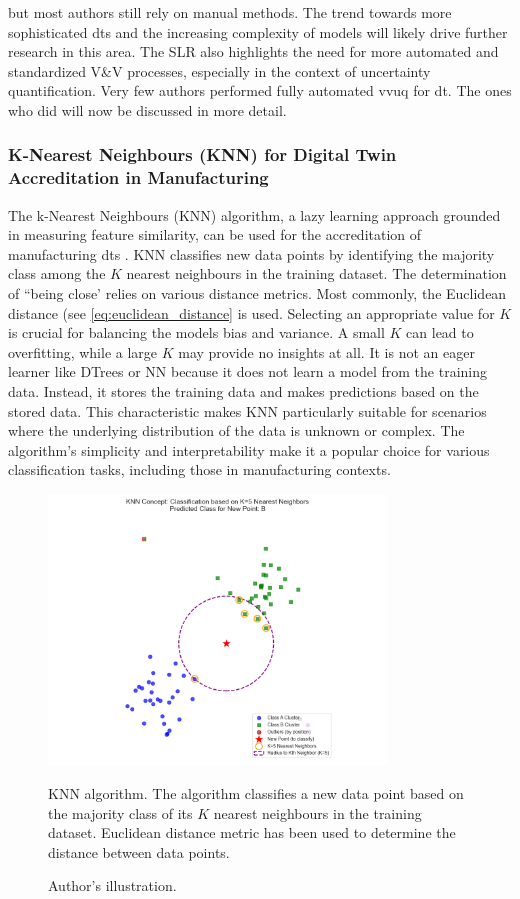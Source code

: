 but most authors still rely on manual methods. The trend towards more sophisticated \gls{dt}s and the increasing complexity of models will likely drive further research in this area. The SLR also highlights the need for more automated and standardized V\&V processes, especially in the context of uncertainty quantification. Very few authors performed fully automated \gls{vvuq} for \gls{dt}. The ones who did will now be discussed in more detail.


\subsubsection*{K-Nearest Neighbours (KNN) for Digital Twin Accreditation in Manufacturing}
\label{sec:knn}

The k-Nearest Neighbours (KNN) algorithm, a lazy learning approach grounded in measuring feature similarity, can be used for the accreditation of manufacturing \gls{dt}s \autocite{dos2024simulation}. KNN classifies new data points by identifying the majority class among the $K$ nearest neighbours in the training dataset. The determination of ``being close' relies on various distance metrics. Most commonly, the Euclidean distance (see \autoref{eq:euclidean_distance} is used. Selecting an appropriate value for $K$ is crucial for balancing the models bias and variance. A small $K$ can lead to overfitting, while a large $K$ may provide no insights at all. It is not an eager learner like DTrees or NN because it does not learn a model from the training data. Instead, it stores the training data and makes predictions based on the stored data. This characteristic makes KNN particularly suitable for scenarios where the underlying distribution of the data is unknown or complex. The algorithm's simplicity and interpretability make it a popular choice for various classification tasks, including those in manufacturing contexts.

\begin{figure}[htbp]
    \centering
    \includegraphics[width=0.8\textwidth]{figures/knn.png}
    \caption[KNN Intuition]{KNN algorithm. The algorithm classifies a new data point based on the majority class of its $K$ nearest neighbours in the training dataset. Euclidean distance metric has been used to determine the distance between data points.}
    \label{fig:knn}
    \caption*{Author's illustration.}
\end{figure}

